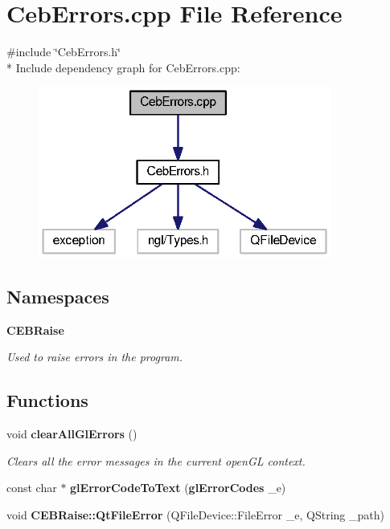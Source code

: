 \section{Ceb\-Errors.\-cpp File Reference}
\label{_ceb_errors_8cpp}
{\ttfamily \#include \char`\"{}Ceb\-Errors.\-h\char`\"{}}\\*
Include dependency graph for Ceb\-Errors.\-cpp\-:\nopagebreak
\begin{figure}[H]
\begin{center}
\leavevmode
\includegraphics[width=272pt]{_ceb_errors_8cpp__incl}
\end{center}
\end{figure}
\subsection*{Namespaces}
\begin{DoxyCompactItemize}
\item 
{\bf C\-E\-B\-Raise}
\begin{DoxyCompactList}\small\item\em Used to raise errors in the program. \end{DoxyCompactList}\end{DoxyCompactItemize}
\subsection*{Functions}
\begin{DoxyCompactItemize}
\item 
void {\bf clear\-All\-Gl\-Errors} ()
\begin{DoxyCompactList}\small\item\em Clears all the error messages in the current open\-G\-L context. \end{DoxyCompactList}\item 
const char $\ast$ {\bf gl\-Error\-Code\-To\-Text} ({\bf gl\-Error\-Codes} \-\_\-e)
\item 
void {\bf C\-E\-B\-Raise\-::\-Qt\-File\-Error} (Q\-File\-Device\-::\-File\-Error \-\_\-e, Q\-String \-\_\-path)
\end{DoxyCompactItemize}


